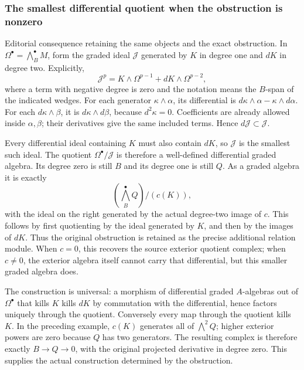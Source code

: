 \subsubsection{The smallest differential quotient when the obstruction is nonzero}\label{algebra-proof-042-the-smallest-differential-quotient-when-the-obstruction-is-nonzero}

Editorial consequence retaining the same objects and the exact obstruction. In \(\Omega^\bullet=\bigwedge_B^\bullet M\), form the graded ideal \(\mathcal J\) generated by \(K\) in degree one and \(dK\) in degree two. Explicitly, \[
\mathcal J^p=K\wedge\Omega^{p-1}+dK\wedge\Omega^{p-2},
\] where a term with negative degree is zero and the notation means the \(B\)-span of the indicated wedges. For each generator \(\kappa\wedge\alpha\), its differential is \(d\kappa\wedge\alpha-\kappa\wedge d\alpha\). For each \(d\kappa\wedge\beta\), it is \(d\kappa\wedge d\beta\), because \(d^2\kappa=0\). Coefficients are already allowed inside \(\alpha,\beta\); their derivatives give the same included terms. Hence \(d\mathcal J\subset\mathcal J\).

Every differential ideal containing \(K\) must also contain \(dK\), so \(\mathcal J\) is the smallest such ideal. The quotient \(\Omega^\bullet/\mathcal J\) is therefore a well-defined differential graded algebra. Its degree zero is still \(B\) and its degree one is still \(Q\). As a graded algebra it is exactly \[
\left(\bigwedge_B^\bullet Q\right)\big/\left(c(K)\right),
\] with the ideal on the right generated by the actual degree-two image of \(c\). This follows by first quotienting by the ideal generated by \(K\), and then by the images of \(dK\). Thus the original obstruction is retained as the precise additional relation module. When \(c=0\), this recovers the source exterior quotient complex; when \(c\ne0\), the exterior algebra itself cannot carry that differential, but this smaller graded algebra does.

The construction is universal: a morphism of differential graded \(A\)-algebras out of \(\Omega^\bullet\) that kills \(K\) kills \(dK\) by commutation with the differential, hence factors uniquely through the quotient. Conversely every map through the quotient kills \(K\). In the preceding example, \(c(K)\) generates all of \(\bigwedge^2Q\); higher exterior powers are zero because \(Q\) has two generators. The resulting complex is therefore exactly \(B\to Q\to0\), with the original projected derivative in degree zero. This supplies the actual construction determined by the obstruction.

